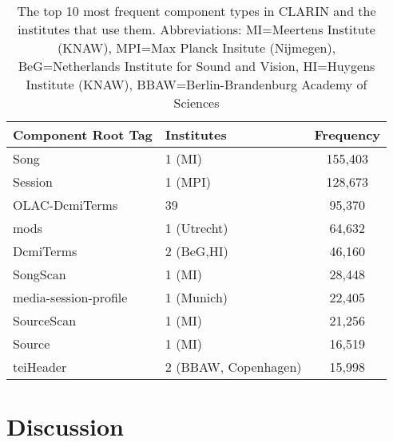 \documentclass{llncs}
\begin{document}
{\begin{table}
\begin{center}
\begin{tabular}{l|lc}
Component Root Tag & Institutes & Frequency \\
\hline
Song & 1 (MI) & 155,403 \\
Session & 1 (MPI) & 128,673 \\
OLAC-DcmiTerms & 39 & 95,370 \\
mods & 1 (Utrecht)& 64,632 \\
DcmiTerms & 2 (BeG,HI) & 46,160 \\
SongScan & 1 (MI) & 28,448 \\
media-session-profile & 1 (Munich) & 22,405 \\
SourceScan & 1 (MI) & 21,256 \\
Source & 1 (MI) & 16,519 \\
teiHeader & 2 (BBAW, Copenhagen) & 15,998 \\
\end{tabular}
\end{center}
\caption{\label{tab:clarin-types}The top 10 most frequent component types in
CLARIN and the institutes that use them. Abbreviations: MI=Meertens Institute (KNAW),
MPI=Max Planck Insitute (Nijmegen), BeG=Netherlands Institute for Sound and Vision,
HI=Huygens Institute (KNAW), BBAW=Berlin-Brandenburg Academy of Sciences}
\end{table}

\section{Discussion}
\label{sec:discussion}
}
\end{document}
